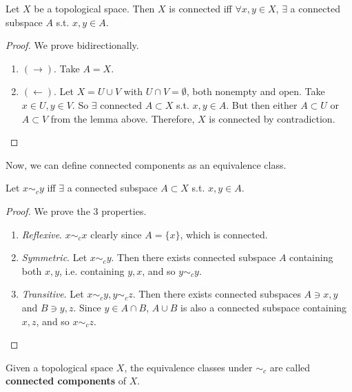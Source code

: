   \begin{theorem}
    \label{thm:points-are-connected-in-a-connected-space}
    Let $X$ be a topological space. Then $X$ is connected iff $\forall x, y \in X$, $\exists$ a connected subspace $A$ s.t. $x, y \in A$. 
  \end{theorem}
  \begin{proof}
    We prove bidirectionally. 
    \begin{enumerate}
      \item $(\rightarrow)$. Take $A = X$. 
      \item $(\leftarrow)$. Let $X = U \cup V$ with $U \cap V = \emptyset$, both nonempty and open. Take $x \in U, y \in V$. So $\exists$ connected $A \subset X$ s.t. $x, y \in A$. But then either $A \subset U$ or $A \subset V$ from the lemma above. Therefore, $X$ is connected by contradiction. 
    \end{enumerate}
  \end{proof}

  Now, we can define connected components as an equivalence class. 

  \begin{corollary}
    \label{thm:connectedness-is-an-equivalence-relation}
    Let $x \sim_c y$ iff $\exists$ a connected subspace $A \subset X$ s.t. $x, y \in A$. 
  \end{corollary}
  \begin{proof}
    We prove the 3 properties. 
    \begin{enumerate}
      \item \textit{Reflexive}. $x \sim_c x$ clearly since $A = \{x\}$, which is connected. 
      \item \textit{Symmetric}. Let $x \sim_c y$. Then there exists connected subspace $A$ containing both $x, y$, i.e. containing $y, x$, and so $y \sim_c y$. 
      \item \textit{Transitive}. Let $x \sim_c y, y \sim_c z$. Then there exists connected subspaces $A \ni x, y$ and $B \ni y, z$. Since $y \in A \cap B$, $A \cup B$ is also a connected subspace containing $x, z$, and so $x \sim_c z$. 
    \end{enumerate}
  \end{proof}

  \begin{definition}
    \label{def:connected-components}
    Given a topological space $X$, the equivalence classes under $\sim_c$ are called \textbf{connected components} of $X$. 
  \end{definition}

